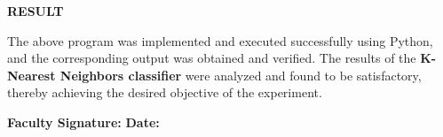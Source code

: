 \documentclass[11pt,twoside]{article}
\newcommand{\expheading}[1]{{\fontsize{14}{17}\selectfont\textbf{#1}\par}}
\newcommand{\tooddpage}{\clearpage\ifodd\value{page}\else\null\thispagestyle{empty}\newpage\fi}
\begin{document}
\tooddpage
\expheading{RESULT}
\vspace{4pt}
{\fontsize{12}{15}\selectfont
The above program was implemented and executed successfully using Python, and the corresponding output was obtained and verified. The results of the \textbf{K-Nearest Neighbors classifier} were analyzed and found to be satisfactory, thereby achieving the desired objective of the experiment.\par
}

\vspace{12pt}

\noindent\textbf{Faculty Signature:} \underline{\hspace{3.6cm}} \hfill \textbf{Date:} \underline{\hspace{2.8cm}}\par

\tooddpage
\end{document}

